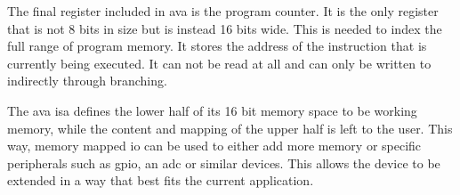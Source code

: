 The final register included in \ac{ava} is the program counter. It is the only register that is not 8 bits in size but is instead 16 bits wide. This is needed to index the full range of program memory. It stores the address of the instruction that is currently being executed. It can not be read at all and can only be written to indirectly through branching.

The \ac{ava} \ac{isa} defines the lower half of its 16 bit memory space to be working memory, while the content and mapping of the upper half is left to the user. This way, memory mapped \ac{io} can be used to either add more memory or specific peripherals such as \ac{gpio}, an \ac{adc} or similar devices. This allows the device to be extended in a way that best fits the current application.